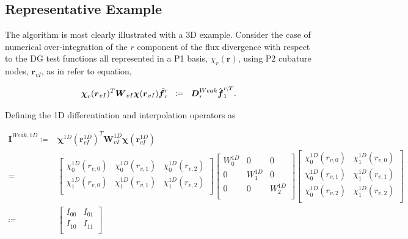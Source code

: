 \documentclass[12pt,Bold,letterpaper,TexShade]{mcgilletdclass}
\numberwithin{equation}{section}
\begin{document}
\subsection{Representative Example}
The algorithm is most clearly illustrated with a 3D example. Consider the case of numerical over-integration of the $r$ component of the flux divergence with respect to the DG test functions all represented in a P1 basis, $\chi_r(\boldsymbol r)$, using P2 cubature nodes, $\boldsymbol r_{vI}$, as in {\color{red} refer to equation},

\begin{equation} \nonumber
\boldsymbol \chi_r(\boldsymbol r_{vI})^T \boldsymbol W_{vI} \boldsymbol \chi(\boldsymbol r_{vI}) \hat{\boldsymbol f^r_{r}} 
\hspace{2mm} \coloneqq \hspace{2mm}
\boldsymbol D^{Weak}_r {\hat{\boldsymbol f}^{r,T}_{1}}.
\end{equation}

Defining the 1D differentiation and interpolation operators as

\begin{equation} \nonumber
\begin{split}
\boldsymbol I^{Weak,1D} 
\coloneqq &
\boldsymbol \chi^{1D}(\boldsymbol r^{1D}_{vI})^T \boldsymbol W^{1D}_{vI} \boldsymbol \chi(\boldsymbol r^{1D}_{vI}) \\
= &
\begin{bmatrix}
\chi^{1D}_0(r_{v,0}) & \chi^{1D}_0(r_{v,1}) & \chi^{1D}_0(r_{v,2}) \\
\chi^{1D}_1(r_{v,0}) & \chi^{1D}_1(r_{v,1}) & \chi^{1D}_1(r_{v,2}) \\
\end{bmatrix}
\begin{bmatrix}
W^{1D}_0 & 0 & 0 \\
0 & W^{1D}_1 & 0 \\
0 & 0 & W^{1D}_2 \\
\end{bmatrix}
\begin{bmatrix}
\chi^{1D}_0(r_{v,0}) & \chi^{1D}_1(r_{v,0}) \\
\chi^{1D}_0(r_{v,1}) & \chi^{1D}_1(r_{v,1}) \\
\chi^{1D}_0(r_{v,2}) & \chi^{1D}_1(r_{v,2}) \\
\end{bmatrix} \\
\coloneqq &
\begin{bmatrix}
I_{00} & I_{01} \\
I_{10} & I_{11} \\
\end{bmatrix}
\end{split}
\end{equation}
\end{document}
